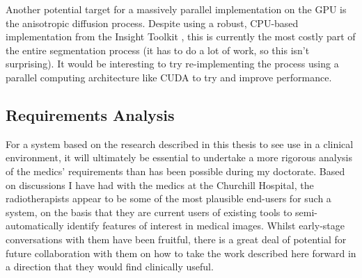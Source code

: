 Another potential target for a massively parallel implementation on the GPU is the anisotropic diffusion process. Despite using a robust, CPU-based implementation from the Insight Toolkit \cite{itk}, this is currently the most costly part of the entire segmentation process (it has to do a lot of work, so this isn't surprising). It would be interesting to try re-implementing the process using a parallel computing architecture like CUDA \cite{cuda} to try and improve performance.

\subsection{Requirements Analysis}

For a system based on the research described in this thesis to see use in a clinical environment, it will ultimately be essential to undertake a more rigorous analysis of the medics' requirements than has been possible during my doctorate. Based on discussions I have had with the medics at the Churchill Hospital, the radiotherapists appear to be some of the most plausible end-users for such a system, on the basis that they are current users of existing tools to semi-automatically identify features of interest in medical images. Whilst early-stage conversations with them have been fruitful, there is a great deal of potential for future collaboration with them on how to take the work described here forward in a direction that they would find clinically useful.